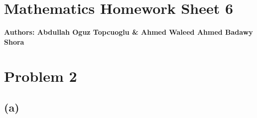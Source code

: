 \documentclass{article}
\begin{document}
\section*{\huge Mathematics Homework Sheet 6}
\begin{flushright}
   \textbf{Authors: Abdullah Oguz Topcuoglu \& Ahmed Waleed Ahmed Badawy Shora}
\end{flushright}


\section*{Problem 2}

\subsection*{(a)}
\end{document}

